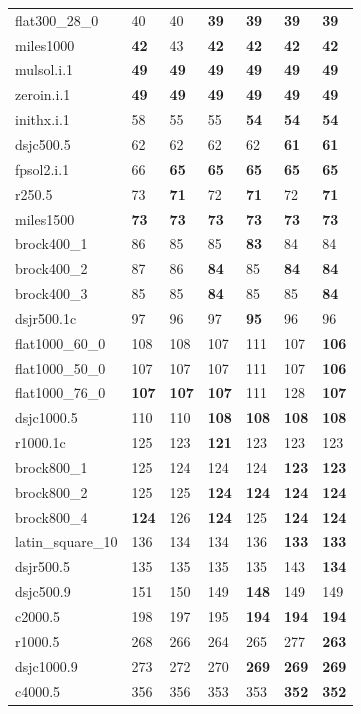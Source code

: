 \documentclass[12pt,a4paper,twoside]{scrartcl}
\numberwithin{equation}{section}
\begin{document}
\begin{landscape}
\begin{table}[]
\begin{tabular}[t]{|p{2.2cm}|p{1.4cm} p{1.4cm}p{1.2cm} p{1.2cm} p{1cm} p{1.2cm}|}
flat300\_28\_0&40&40&\textbf{39}&\textbf{39}&\textbf{39}&\textbf{39}\\ 
miles1000&\textbf{42}&43&\textbf{42}&\textbf{42}&\textbf{42}&\textbf{42}\\ 
mulsol.i.1&\textbf{49}&\textbf{49}&\textbf{49}&\textbf{49}&\textbf{49}&\textbf{49}\\ 
zeroin.i.1&\textbf{49}&\textbf{49}&\textbf{49}&\textbf{49}&\textbf{49}&\textbf{49}\\  \hline
inithx.i.1&58&55&55&\textbf{54}&\textbf{54}&\textbf{54}\\
dsjc500.5&62&62&62&62&\textbf{61}&\textbf{61}\\
fpsol2.i.1&66&\textbf{65}&\textbf{65}&\textbf{65}&\textbf{65}&\textbf{65}\\ 
r250.5&73&\textbf{71}&72&\textbf{71}&72&\textbf{71}\\
miles1500&\textbf{73}&\textbf{73}&\textbf{73}&\textbf{73}&\textbf{73}&\textbf{73}\\ \hline
brock400\_1&86&85&85&\textbf{83}&84&84\\ 
brock400\_2&87&86&\textbf{84}&85&\textbf{84}&\textbf{84}\\ 
brock400\_3&85&85&\textbf{84}&85&85&\textbf{84}\\ 
dsjr500.1c&97&96&97&\textbf{95}&96&96\\
flat1000\_60\_0&108&108&107&111&107&\textbf{106}\\ \hline
flat1000\_50\_0&107&107&107&111&107&\textbf{106}\\ 
flat1000\_76\_0&\textbf{107}&\textbf{107}&\textbf{107}&111&128&\textbf{107}\\ 
dsjc1000.5&110&110&\textbf{108}&\textbf{108}&\textbf{108}&\textbf{108}\\ 
r1000.1c&125&123&\textbf{121}&123&123&123\\ 
brock800\_1&125&124&124&124&\textbf{123}&\textbf{123}\\ \hline 
brock800\_2&125&125&\textbf{124}&\textbf{124}&\textbf{124}&\textbf{124}\\
brock800\_4&\textbf{124}&126&\textbf{124}&125&\textbf{124}&\textbf{124}\\ 
latin\_square\_10&136&134&134&136&\textbf{133}&\textbf{133}\\
dsjr500.5&135&135&135&135&143&\textbf{134}\\ 
dsjc500.9&151&150&149&\textbf{148}&149&149\\\hline 
c2000.5&198&197&195&\textbf{194}&\textbf{194}&\textbf{194}\\ 
r1000.5&268&266&264&265&277&\textbf{263}\\ 
dsjc1000.9&273&272&270&\textbf{269}&\textbf{269}&\textbf{269}\\ 
c4000.5&356&356&353&353&\textbf{352}&\textbf{352}\\ \hline
\end{tabular}
\end{table}
\end{landscape}
\end{document}
